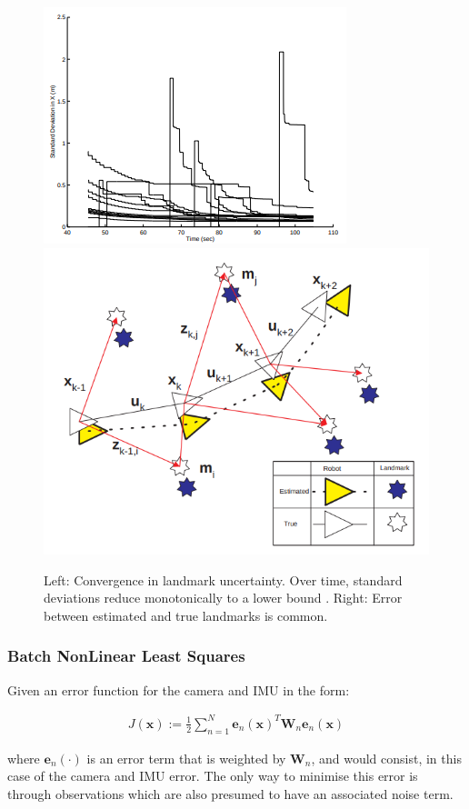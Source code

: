 \documentclass[a4paper,11pt,notitlepage]{article}
\begin{document}
\noindent \begin{figure}[h!]
\includegraphics[width = 0.5\hsize]{figures/convergence_landmark_uncertainty.png}
\includegraphics[width = 0.5\hsize]{figures/ess_slam.png}
\caption{Left: Convergence in landmark uncertainty.  Over time, standard deviations reduce monotonically to a lower bound \cite{F_Durr_Pt1}. Right: Error between estimated and true landmarks is common.}
\label{slam_prob_fig}
\end{figure}


\subsubsection{Batch NonLinear Least Squares}

Given an error function for the camera and IMU in the form:

\begin{equation}
\begin{aligned}
J(\mathbf{x}) := \frac{1}{2} \sum_{n=1}^{N} \textbf{e}_{n} (\textbf{x})^{T} \textbf{W}_{n} \textbf{e}_{n}(\textbf{x}) 
\end{aligned}
\end{equation} 

where $\textbf{e}_{n}(\cdot)$ is an error term that is weighted by $\textbf{W}_{n}$, and would consist, in this case of the camera and IMU error. The only way to minimise this error is through observations which are also presumed to have an associated noise term.
\end{document}
